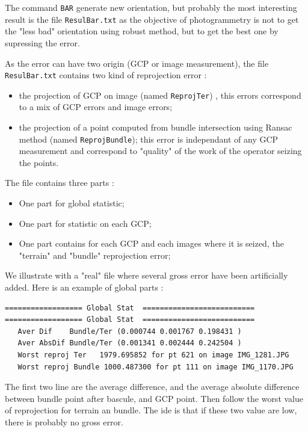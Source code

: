 The command {\tt BAR} generate new orientation, but probably the most interesting result 
is the file {\tt ResulBar.txt} as  the objective of photogrammetry is not to get the "less bad" orientation 
using robust method, but to get the best one by supressing the error.

As the error can have two origin (GCP or image measurement), the file  {\tt ResulBar.txt} contains
two kind of reprojection error :

\begin{itemize}
   \item the projection of GCP on image (named {\tt ReprojTer}) , this errors correspond to a mix of
         GCP errors and  image errors;

   \item the projection of a point computed from bundle intersection using Ransac method (named {\tt ReprojBundle}); 
         this error is independant of any GCP measurement and correspond to "quality" of the work
          of the operator seizing the points.
\end{itemize}

The file contains three parts :

\begin{itemize}
   \item One part for global statistic;

   \item One part for statistic on each GCP;

   \item One part contains for each GCP and each images where it is seized, the "terrain" and "bundle" 
         reprojection error;
\end{itemize}


We illustrate with a "real" file  where several gross error have been artificially added.
Here is an example of global parts :


\begin{verbatim}
================== Global Stat  ==========================
================== Global Stat  ==========================
   Aver Dif    Bundle/Ter (0.000744 0.001767 0.198431 )
   Aver AbsDif Bundle/Ter (0.001341 0.002444 0.242504 )
   Worst reproj Ter   1979.695852 for pt 621 on image IMG_1281.JPG
   Worst reproj Bundle 1000.487300 for pt 111 on image IMG_1170.JPG
\end{verbatim}

The first two line are the average difference, and the average absolute difference between
bundle point after bascule, and GCP point. Then follow the worst value of reprojection
for terrain an bundle. The ide is  that if these two value are low, there is probably
no gross error.

